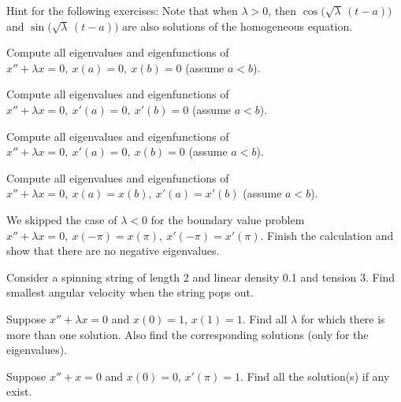 Hint for the following exercises:  Note that
when $\lambda > 0$, then
$\cos \bigl( \! \sqrt{\lambda}\, (t - a) \bigr)$
and $\sin  \bigl( \! \sqrt{\lambda}\, (t - a) \bigr)$
are also solutions of the homogeneous
equation.

\begin{exercise}
Compute all
eigenvalues and eigenfunctions of
$x'' + \lambda x = 0, ~ x(a) = 0, ~ x(b) = 0$ (assume $a < b$).
\end{exercise}

\begin{exercise}
Compute all
eigenvalues and eigenfunctions of
$x'' + \lambda x = 0, ~ x'(a) = 0, ~ x'(b) = 0$ (assume $a < b$).
\end{exercise}

\begin{exercise}
Compute all
eigenvalues and eigenfunctions of
$x'' + \lambda x = 0, ~ x'(a) = 0, ~ x(b) = 0$ (assume $a < b$).
\end{exercise}

\begin{exercise}
Compute all 
eigenvalues and eigenfunctions of
$x'' + \lambda x = 0, ~ x(a) = x(b), ~ x'(a) = x'(b)$ (assume $a < b$).
\end{exercise}

\begin{exercise}
We skipped the case of $\lambda < 0$ for
the boundary value problem
$x'' + \lambda x = 0, ~ x(-\pi) = x(\pi), ~ x'(-\pi) = x'(\pi)$.
Finish the calculation and show that there are no negative eigenvalues.
\end{exercise}

\setcounter{exercise}{100}

\begin{exercise}
Consider a spinning string of length 2 and linear density 0.1 and tension 3.
Find smallest angular velocity when the string pops out.
\end{exercise}

\begin{exercise}
Suppose $x'' + \lambda x = 0$ and $x(0)=1$, $x(1) = 1$.
Find all $\lambda$ for which there is more
than one solution.  Also find the corresponding solutions (only for the
eigenvalues).
\end{exercise}

\begin{exercise}
Suppose $x'' + x = 0$ and $x(0)=0$, $x'(\pi) = 1$.
Find all the solution(s) if any exist.
\end{exercise}

